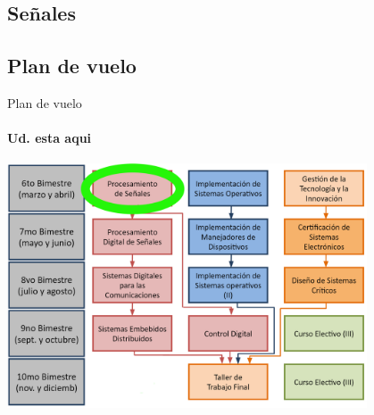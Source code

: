   \begin{darkframes}
    \section{Señales}
    \subsection{Plan de vuelo}
    \begin{frame}{Plan de vuelo}
      \framesubtitle{Ud. esta aqui}
      \center\includegraphics[width=0.8\textwidth]{1_clase/Esquema_MSE}
      \vfill
    \end{frame}


\end{darkframes}
